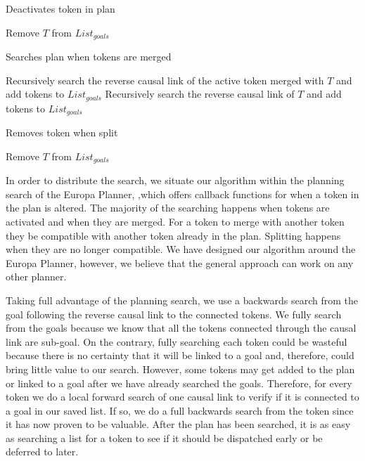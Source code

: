 \begin{algorithm}
\caption{Deactivates token in plan}
\label{NotifyDeactivated}
\begin{algorithmic}
	\State Remove $T$ from $List_{goals}$
\EndIf
\EndFunction
\end{algorithmic}
\end{algorithm}

\begin{algorithm}
\caption{Searches plan when tokens are merged}
\label{NotifyMerged}
\begin{algorithmic}
	\State Recursively search the reverse causal link of the active token merged with $T$ and add tokens to $List_{goals}$
	\State Recursively search the reverse causal link of $T$ and add tokens to $List_{goals}$
\EndIf
\EndFunction
\end{algorithmic}
\end{algorithm}

\begin{algorithm}
\caption{Removes token when split}
\label{NotifySplit}
\begin{algorithmic}
	\State Remove $T$ from $List_{goals}$
\EndIf
\EndFunction
\end{algorithmic}
\end{algorithm}

In order to distribute the search, we situate our algorithm within the
planning search of the Europa Planner,\cite{frank2003} ,which offers 
callback functions for when a token in the plan is altered. The majority
of the searching happens when tokens are activated and when they 
are merged. For a token to merge with another token they be compatible with
another token already in the plan. Splitting happens when they are
no longer compatible. We have designed our algorithm around the
Europa Planner, however, we believe that the general approach
can work on any other planner. 

Taking full advantage of the planning search, we
use a backwards search from the goal following the reverse causal link
to the connected tokens.  We fully search from the goals because we
know that all the tokens connected through the causal link are
sub-goal.  On the contrary, fully searching each token could be
wasteful because there is no certainty that it will be linked to a
goal and, therefore, could bring little value to our search. However,
some tokens may get added to the plan or linked to a goal after we
have already searched the goals. Therefore, for every token we do a
local forward search of one causal link to verify if it is connected
to a goal in our saved list.  If so, we do a full backwards search
from the token since it has now proven to be valuable. After the plan
has been searched, it is as easy as searching a list for a token to
see if it should be dispatched early or be deferred to later.




